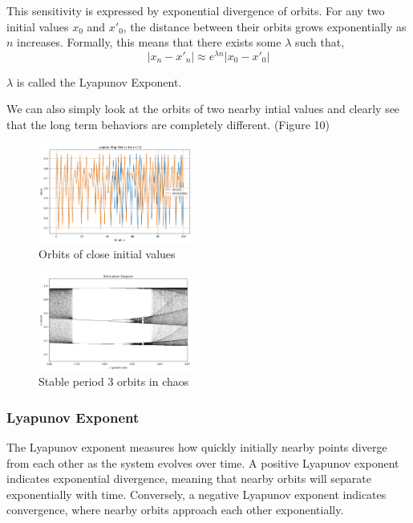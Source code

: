 \documentclass[11pt,twocolumn]{article}
\begin{document}
This sensitivity is expressed by exponential divergence of orbits. For any two initial values $x_0$ and $x'_0$, the distance between their orbits grows exponentially as $n$ increases.
Formally, this means that there exists some $\lambda$ such that,
\begin{equation}
	|x_n-x'_n|\approx e^{\lambda n}|x_0-x'_0|
\end{equation}

$\lambda$ is called the Lyapunov Exponent.

\cite{Czornik2013}

We can also simply look at the orbits of two nearby intial values and clearly see that the long term behaviors are completely different. (Figure 10)
\begin{figure}
    \centering
\includegraphics[width=0.45\textwidth]{figures/sensitivity.png}
    \caption{Orbits of close initial values}
    \label{fig:enter-label}
\end{figure}
\begin{figure}
    \centering
\includegraphics[width=0.45\textwidth]{figures/p3region.png}
    \caption{Stable period $3$ orbits in chaos}
    \label{fig:enter-label}
\end{figure}
\subsubsection{Lyapunov Exponent}
The Lyapunov exponent measures how quickly initially nearby points diverge from each other as the system evolves over time.
A positive Lyapunov exponent indicates exponential divergence, meaning that nearby orbits will separate exponentially with time.
Conversely, a negative Lyapunov exponent indicates convergence, where nearby orbits approach each other exponentially. 
\end{document}
